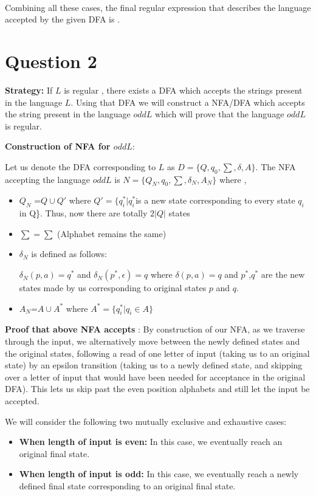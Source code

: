 \documentclass[12pt,a4paper]{article}
\begin{document}
\\Combining all these cases, the final regular expression that describes the language accepted by the given DFA is .
\unboldmath

\section{Question 2}

\textbf{Strategy:}
If $L$ is regular , there exists a DFA which accepts the strings present in the language $L$. Using that DFA we will construct a NFA/DFA which accepts the string present in the language $oddL$ which will prove that the language $oddL$ is regular.

\textbf{Construction of NFA for $oddL$}:

Let us denote the DFA corresponding to $L$ as $D=\{Q,q_0,\sum,\delta,A\}$.
The NFA accepting the language $oddL$ is $N=\{Q_N,q_0,\sum,\delta_N,A_N\}$ where ,

\begin{itemize}
    \item   $Q_N$ =$Q \cup Q' $ where $Q'=\{q^*_i| q^*_i $is a new state corresponding to every state $q_i$ in Q\}. Thus, now there are totally $2|Q|$ states
   \item $\sum=\sum$ (Alphabet remains the same)
   \item $\delta_N$ is defined as follows:
   
   $\delta_N(p,a)=q^*$ and $\delta_N(p^*,\epsilon)=q$ where $\delta(p,a)=q$ and $p^*$,$q^*$ are the new states made by us corresponding to original states $p$ and $q$.
   \item $A_N$=$A \cup A^*$ where $A^*=\{q^*_i | q_i \in A \}$
   
   
\end{itemize}
  
  \textbf{Proof that above NFA accepts }:
  By construction of our NFA, as we traverse through the input, we alternatively move between the newly defined states and the original states, following a read of one letter of input (taking us to an original state) by an epsilon transition (taking us to a newly defined state, and skipping over a letter of input that would have been needed for acceptance in the original DFA). This lets us skip past the even position alphabets and still let the input be accepted.
  
  
  We will consider the following two mutually exclusive and exhaustive cases:
  \begin{itemize}
      \item \textbf{When length of input is even:}
        In this case, we eventually reach an original final state.
      \item \textbf{When length of input is odd:}
      In this case, we eventually reach a newly defined final state corresponding to an original final state.
  \end{itemize}
\end{document}
